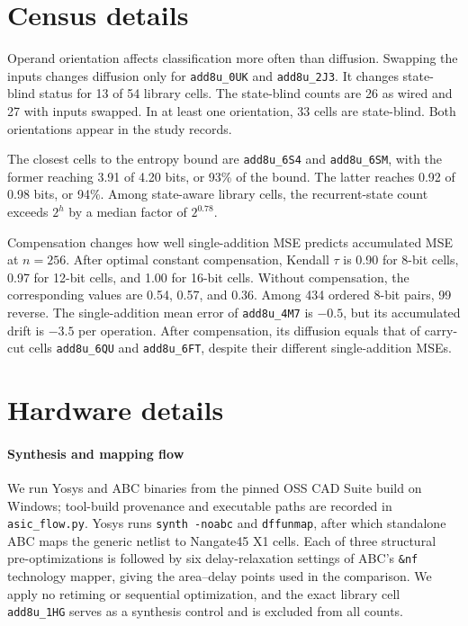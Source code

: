 \documentclass[11pt]{article}
\begin{document}
\section{Census details}

Operand orientation affects classification more often than diffusion.
Swapping the inputs changes diffusion only for \texttt{add8u\_0UK} and
\texttt{add8u\_2J3}. It changes state-blind status for 13 of 54
library cells. The state-blind counts are 26 as wired and 27 with
inputs swapped. In at least one orientation, 33 cells are
state-blind. Both orientations appear in the study records.

The closest cells to the entropy bound are \texttt{add8u\_6S4} and
\texttt{add8u\_6SM}, with the former reaching 3.91 of 4.20 bits, or 93\% of the
bound. The latter reaches 0.92 of 0.98 bits, or 94\%.
Among state-aware library cells, the recurrent-state count exceeds $2^h$
by a median factor of $2^{0.78}$.

Compensation changes how well single-addition MSE predicts accumulated MSE
at $n=256$. After optimal constant compensation, Kendall $\tau$ is 0.90
for 8-bit cells, 0.97 for 12-bit cells, and 1.00 for 16-bit cells. Without
compensation, the corresponding values are 0.54, 0.57, and 0.36. Among
434 ordered 8-bit pairs, 99 reverse. The single-addition mean error of
\texttt{add8u\_4M7} is
$-0.5$, but its accumulated drift is $-3.5$ per operation. After
compensation, its diffusion equals that of carry-cut cells
\texttt{add8u\_6QU} and \texttt{add8u\_6FT}, despite their different
single-addition MSEs.

\section{Hardware details}

\paragraph{Synthesis and mapping flow}
We run Yosys and ABC binaries from the pinned OSS CAD Suite
build on Windows; tool-build provenance and executable paths are recorded
in \texttt{asic\_flow.py}. Yosys runs \texttt{synth -noabc} and
\texttt{dffunmap}, after which standalone ABC maps the generic netlist to
Nangate45 X1 cells. Each of three structural pre-optimizations is followed
by six delay-relaxation settings of ABC's \texttt{\&nf} technology mapper,
giving the area--delay points used in the comparison. We apply no retiming
or sequential optimization, and the exact library cell
\texttt{add8u\_1HG} serves as a synthesis control and is excluded from all
counts.
\end{document}
